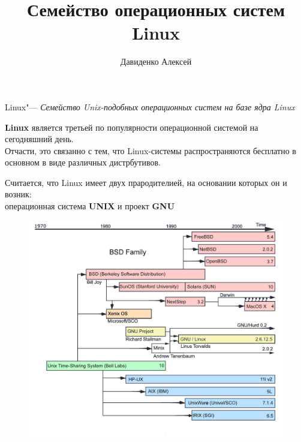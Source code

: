 \documentclass[14pt]{beamer}
\title{Семейство операционных систем Linux}
\author{Давиденко Алексей}
\date{}
\begin{document}
\begin{frame}[plain]
\titlepage
\end{frame}

\begin{frame}
\begin{block}{Linux"---}
\textit{Семейство Unix-подобных операционных систем
на базе ядра Linux}
\end{block}
\end{frame}

\begin{frame}
\begin{block}

\textbf{Linux} является третьей по популярности 
операционной системой на сегодняшний день.\\
Отчасти, это связанно с тем, что Linux-системы 
распространяются бесплатно в основном в виде 
различных дистрбутивов.
\end{block}
\end{frame}

\begin{frame}
\begin{block}

Считается, что Linux имеет двух прародителией, на 
основании которых он и возник:
\\операционная система \textbf{UNIX} и проект 
\textbf{GNU}
\end{block}
\end{frame}

\begin{frame}
\begin{figure}[h]
    \centering
    \includegraphics[height=0.69258\textheight]
    {Timeline_of_Unix_families}
    
\end{figure}
\end{frame}
\end{document}
